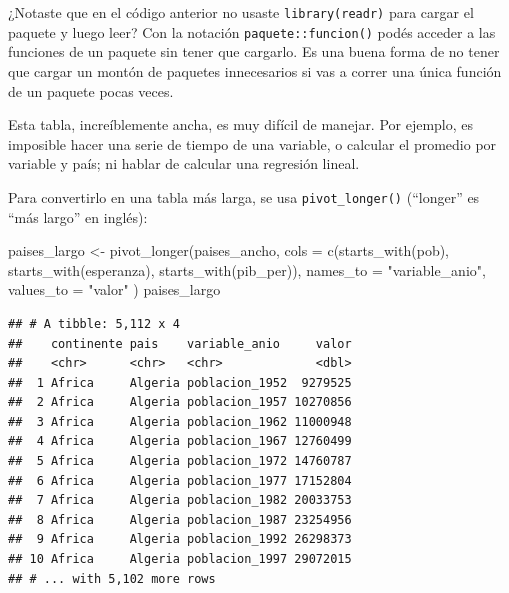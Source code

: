 \documentclass[
  openany]{book}
\newenvironment{Shaded}{\begin{snugshade}}{\end{snugshade}}
\newcommand{\AttributeTok}[1]{\textcolor[rgb]{0.77,0.63,0.00}{#1}}
\newcommand{\FunctionTok}[1]{\textcolor[rgb]{0.00,0.00,0.00}{#1}}
\newcommand{\NormalTok}[1]{#1}
\newcommand{\OtherTok}[1]{\textcolor[rgb]{0.56,0.35,0.01}{#1}}
\newcommand{\StringTok}[1]{\textcolor[rgb]{0.31,0.60,0.02}{#1}}
\begin{document}
¿Notaste que en el código anterior no usaste \texttt{library(readr)} para cargar el paquete y luego leer?
Con la notación \texttt{paquete::funcion()} podés acceder a las funciones de un paquete sin tener que cargarlo.
Es una buena forma de no tener que cargar un montón de paquetes innecesarios si vas a correr una única función de un paquete pocas veces.

Esta tabla, increíblemente ancha, es muy difícil de manejar.
Por ejemplo, es imposible hacer una serie de tiempo de una variable, o calcular el promedio por variable y país; ni hablar de calcular una regresión lineal.

Para convertirlo en una tabla más larga, se usa \texttt{pivot\_longer()} (``longer'' es ``más largo'' en inglés):

\begin{Shaded}
\begin{Highlighting}[]
\NormalTok{paises\_largo }\OtherTok{\textless{}{-}} \FunctionTok{pivot\_longer}\NormalTok{(paises\_ancho,}
                             \AttributeTok{cols =} \FunctionTok{c}\NormalTok{(}\FunctionTok{starts\_with}\NormalTok{(}\StringTok{\textquotesingle{}pob\textquotesingle{}}\NormalTok{), }
                                      \FunctionTok{starts\_with}\NormalTok{(}\StringTok{\textquotesingle{}esperanza\textquotesingle{}}\NormalTok{), }
                                      \FunctionTok{starts\_with}\NormalTok{(}\StringTok{\textquotesingle{}pib\_per\textquotesingle{}}\NormalTok{)),}
                             \AttributeTok{names\_to =} \StringTok{"variable\_anio"}\NormalTok{, }
                             \AttributeTok{values\_to =} \StringTok{"valor"}
\NormalTok{)}
\NormalTok{paises\_largo}
\end{Highlighting}
\end{Shaded}

\begin{verbatim}
## # A tibble: 5,112 x 4
##    continente pais    variable_anio     valor
##    <chr>      <chr>   <chr>             <dbl>
##  1 Africa     Algeria poblacion_1952  9279525
##  2 Africa     Algeria poblacion_1957 10270856
##  3 Africa     Algeria poblacion_1962 11000948
##  4 Africa     Algeria poblacion_1967 12760499
##  5 Africa     Algeria poblacion_1972 14760787
##  6 Africa     Algeria poblacion_1977 17152804
##  7 Africa     Algeria poblacion_1982 20033753
##  8 Africa     Algeria poblacion_1987 23254956
##  9 Africa     Algeria poblacion_1992 26298373
## 10 Africa     Algeria poblacion_1997 29072015
## # ... with 5,102 more rows
\end{verbatim}
\end{document}
